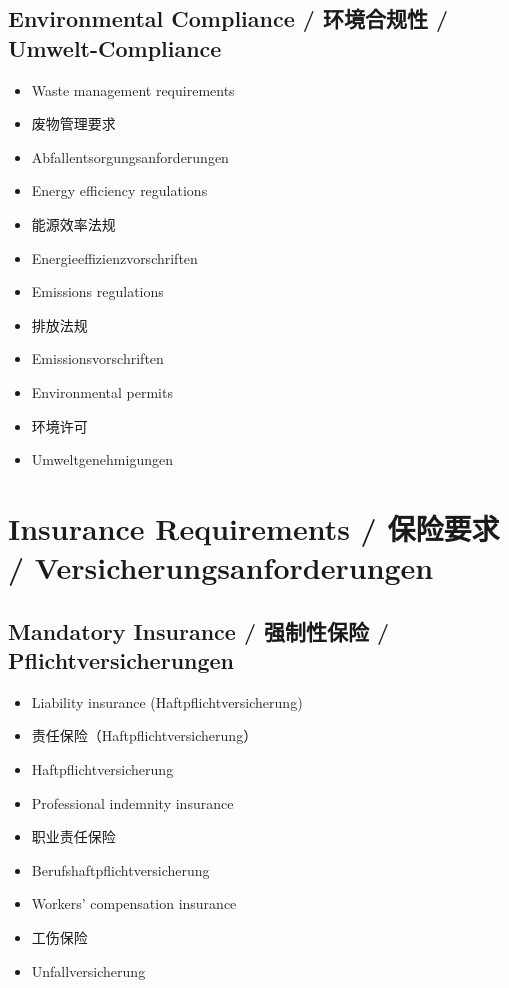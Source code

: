 \subsection{Environmental Compliance / 环境合规性 / Umwelt-Compliance}
\begin{itemize}
    \item Waste management requirements
    \item 废物管理要求
    \item Abfallentsorgungsanforderungen
    \item Energy efficiency regulations
    \item 能源效率法规
    \item Energieeffizienzvorschriften
    \item Emissions regulations
    \item 排放法规
    \item Emissionsvorschriften
    \item Environmental permits
    \item 环境许可
    \item Umweltgenehmigungen
\end{itemize}

\section{Insurance Requirements / 保险要求 / Versicherungsanforderungen}

\subsection{Mandatory Insurance / 强制性保险 / Pflichtversicherungen}
\begin{itemize}
    \item Liability insurance (Haftpflichtversicherung)
    \item 责任保险（Haftpflichtversicherung）
    \item Haftpflichtversicherung
    \item Professional indemnity insurance
    \item 职业责任保险
    \item Berufshaftpflichtversicherung
    \item Workers' compensation insurance
    \item 工伤保险
    \item Unfallversicherung
\end{itemize}

